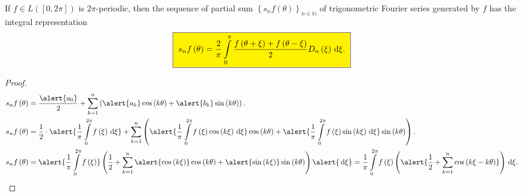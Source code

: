 \begin{frame}[allowframebreaks]
	\begin{lemma}
		If $f\in L\left(\left[0,2\pi\right]\right)$ is $2\pi$-periodic,
		then the sequence of partial sum
		$\left\{s_{n}f\left(\theta\right)\right\}_{n\in\mathds{N}}$ of
		trigonometric Fourier series generated by $f$ has the integral
		representation
		\begin{equation*}
			\fcolorbox{DarkBlue}{yellow}{
				\begin{math}
					\displaystyle
					s_{n}f\left(\theta\right)=
					\frac{2}{\pi}\int\limits_{0}^{\pi}
					\frac{f\left(\theta+\xi\right)+f\left(\theta-\xi\right)}{2}
					D_{n}\left(\xi\right)\dl\xi.
				\end{math}
			}
		\end{equation*}
	\end{lemma}

	\begin{proof}
		\begin{align*}
			s_{n}f\left(\theta\right) & =
			\frac{\alert{a_{0}}}{2}+
			\sum_{k=1}^{n}
			\left(
			\alert{a_{k}}\cos\left(k\theta\right)+
			\alert{b_{k}}\sin\left(k\theta\right)
			\right).                      \\
			s_{n}f\left(\theta\right) & =
			\frac{1}{2}\cdot
			\alert{
				\frac{1}{\pi}
				\int\limits_{0}^{2\pi}
				f\left(\xi\right)\dl\xi
			}+
			\sum_{k=1}^{n}
			\left(
			\alert{
				\frac{1}{\pi}
				\int\limits_{0}^{2\pi}
				f\left(\xi\right)\cos\left(k\xi\right)\dl\xi
			}
			\cos\left(k\theta\right)+
			\alert{
				\frac{1}{\pi}
				\int\limits_{0}^{2\pi}
				f\left(\xi\right)\sin\left(k\xi\right)\dl\xi
			}
			\sin\left(k\theta\right)
			\right).                      \\
			s_{n}f\left(\theta\right) & =
			\alert{
				\frac{1}{\pi}
				\int\limits_{0}^{2\pi}
				f\left(\xi\right)
			}
			\left(
			\frac{1}{2}
			+
			\sum_{k=1}^{n}
			\alert{\cos\left(k\xi\right)}
			\cos\left(k\theta\right)+
			\alert{\sin\left(k\xi\right)}
			\sin\left(k\theta\right)
			\right)
			\alert{\dl\xi}=
			\frac{1}{\pi}
			\int\limits_{0}^{2\pi}
			f\left(\xi\right)
			\left(
			\alert{
				\frac{1}{2}
				+
				\sum_{k=1}^{n}
				\cos\left(k\xi-k\theta\right)
			}
			\right)\dl\xi.
		\end{align*}

		\framebreak


\end{proof}
\end{frame}
